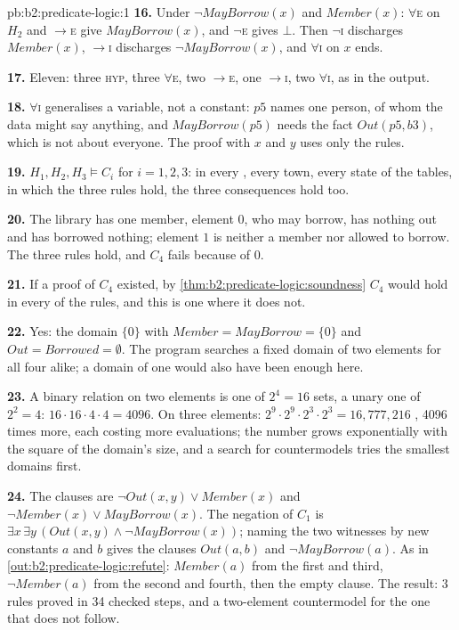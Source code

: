 \begin{solution}{pb:b2:predicate-logic:1}
\textbf{16.} Under $\neg\mathit{MayBorrow}(x)$ and $\mathit{Member}(x)$: $\forall$\textsc{e} on $H_2$ and $\to$\textsc{e}
give $\mathit{MayBorrow}(x)$, and $\neg$\textsc{e} gives $\bot$. Then $\neg$\textsc{i} discharges $\mathit{Member}(x)$,
$\to$\textsc{i} discharges $\neg\mathit{MayBorrow}(x)$, and $\forall$\textsc{i} on $x$ ends.

\textbf{17.} Eleven: three \textsc{hyp}, three $\forall$\textsc{e}, two $\to$\textsc{e}, one $\to$\textsc{i}, two
$\forall$\textsc{i}, as in the output.

\textbf{18.} $\forall$\textsc{i} generalises a variable, not a constant: $p5$ names one person, of whom the data might
say anything, and $\mathit{MayBorrow}(p5)$ needs the fact $\mathit{Out}(p5, b3)$, which is not about everyone. The
proof with $x$ and $y$ uses only the rules.

\textbf{19.} $H_1, H_2, H_3 \models C_i$ for $i = 1, 2, 3$: in every , every town, every state of the tables,
in which the three rules hold, the three consequences hold too.

\textbf{20.} The library has one member, element $0$, who may borrow, has nothing out and has borrowed nothing; element
$1$ is neither a member nor allowed to borrow. The three rules hold, and $C_4$ fails because of $0$.

\textbf{21.} If a proof of $C_4$ existed, by \cref{thm:b2:predicate-logic:soundness} $C_4$ would hold in every  of
the rules, and this  is one where it does not.

\textbf{22.} Yes: the domain $\{0\}$ with $\mathit{Member} = \mathit{MayBorrow} = \{0\}$ and $\mathit{Out} =
\mathit{Borrowed} = \emptyset$. The program searches a fixed domain of two elements for all four  alike; a
domain of one would also have been enough here.

\textbf{23.} A binary relation on two elements is one of $2^4 = 16$ sets, a unary one of $2^2 = 4$: $16 \cdot 16 \cdot 4
\cdot 4 = 4096$. On three elements: $2^9 \cdot 2^9 \cdot 2^3 \cdot 2^3 = 16{,}777{,}216$ , 4096 times more,
each costing more evaluations; the number grows exponentially with the square of the domain's size, and a search for
countermodels tries the smallest domains first.

\textbf{24.} The clauses are $\neg\mathit{Out}(x, y) \vee \mathit{Member}(x)$ and $\neg\mathit{Member}(x) \vee
\mathit{MayBorrow}(x)$. The negation of $C_1$ is $\exists x\, \exists y\, (\mathit{Out}(x, y) \wedge
\neg\mathit{MayBorrow}(x))$; naming the two witnesses by new constants $a$ and $b$ gives the clauses $\mathit{Out}(a,
b)$ and $\neg\mathit{MayBorrow}(a)$. As in \cref{out:b2:predicate-logic:refute}: $\mathit{Member}(a)$ from the first
and third, $\neg\mathit{Member}(a)$ from the second and fourth, then the empty clause. The result: 3 rules proved in 34
checked steps, and a two-element countermodel for the one that does not follow.
\end{solution}
